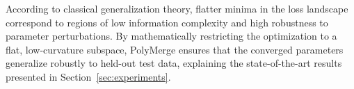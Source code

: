 According to classical generalization theory, flatter minima in the loss landscape correspond to regions of low information complexity and high robustness to parameter perturbations. By mathematically restricting the optimization to a flat, low-curvature subspace, PolyMerge ensures that the converged parameters generalize robustly to held-out test data, explaining the state-of-the-art results presented in Section~\ref{sec:experiments}.
